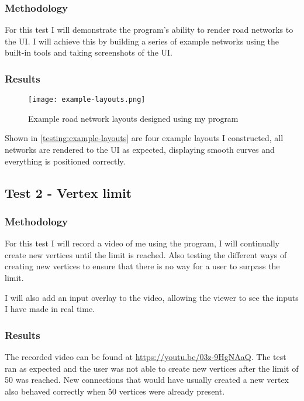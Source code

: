         \subsubsection{Methodology}

            For this test I will demonstrate the program's ability to render road networks to the UI. I will achieve this by building a series of example networks using the built-in tools and taking screenshots of the UI.

        \subsubsection{Results}

            \begin{figure}[ht]
                \centering
                \texttt{[image: example-layouts.png]}
                \caption{Example road network layouts designed using my program}
                \label{testing:example-layouts}
            \end{figure}

            Shown in \autoref{testing:example-layouts} are four example layouts I constructed, all networks are rendered to the UI as expected, displaying smooth curves and everything is positioned correctly.

    \subsection{Test 2 - Vertex limit}

        \subsubsection{Methodology}

            For this test I will record a video of me using the program, I will continually create new vertices until the limit is reached. Also testing the different ways of creating new vertices to ensure that there is no way for a user to surpass the limit.

            I will also add an input overlay to the video, allowing the viewer to see the inputs I have made in real time.

        \subsubsection{Results}

            The recorded video can be found at \href{https://youtu.be/03z-9HgNAaQ}{https://youtu.be/03z-9HgNAaQ}. The test ran as expected and the user was not able to create new vertices after the limit of 50 was reached. New connections that would have usually created a new vertex also behaved correctly when 50 vertices were already present.

